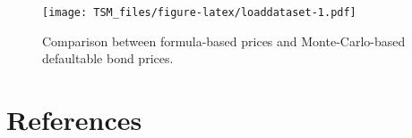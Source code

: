 \documentclass[
  12pt,
]{book}
\theoremstyle{definition}
\theoremstyle{definition}
\theoremstyle{definition}
\theoremstyle{definition}
\theoremstyle{remark}
\begin{document}
\begin{figure}
\centering
\texttt{[image: TSM\_files/figure-latex/loaddataset-1.pdf]}
\caption{\label{fig:loaddataset}Comparison between formula-based prices and Monte-Carlo-based defaultable bond prices.}
\end{figure}

\hypertarget{references}{%
\chapter{References}\label{references}}

  
\end{document}
